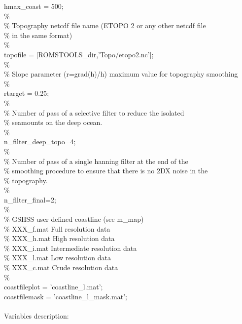 hmax\_coast = 500;\\
\%\\
\%  Topography netcdf file name (ETOPO 2 or any other netcdf file\\
\%  in the same format)\\
\%\\
topofile = [ROMSTOOLS\_dir,'Topo/etopo2.nc'];\\
\%\\
\% Slope parameter (r=grad(h)/h) maximum value for topography smoothing\\
\%\\
rtarget = 0.25;\\
\%\\
\% Number of pass of a selective filter to reduce the isolated\\
\% seamounts on the deep ocean.\\
\%\\
n\_filter\_deep\_topo=4;\\
\%\\
\% Number of pass of a single hanning filter at the end of the\\
\% smoothing procedure to ensure that there is no 2DX noise in the \\
\% topography.\\
\%\\
n\_filter\_final=2;\\
\%\\
\%  GSHSS user defined coastline (see m\_map) \\
\%  XXX\_f.mat    Full resolution data\\
\%  XXX\_h.mat    High resolution data\\
\%  XXX\_i.mat    Intermediate resolution data\\
\%  XXX\_l.mat    Low resolution data\\
\%  XXX\_c.mat    Crude resolution data\\
\%\\
coastfileplot = 'coastline\_l.mat';\\
coastfilemask = 'coastline\_l\_mask.mat';\\
\\
Variables description:

